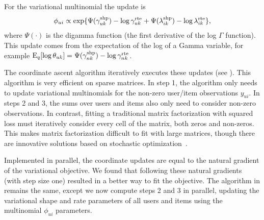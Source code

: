 \documentclass{sig-alternate}
\begin{document}
For the variational multinomial the update is
\begin{equation}
  \phi_{ui} \propto \exp\{\Psi(\gamma_{uk}^{\textrm{shp}}) - \log
  \gamma_{uk}^{\textrm{rte}} + \Psi(\lambda_{ik}^{\textrm{shp}}) - \log
  \lambda_{ik}^{\textrm{rte}}\},
\end{equation}
where $\Psi(\cdot)$ is the digamma function (the first derivative of
the log $\Gamma$ function).  This update comes from the expectation of
the log of a Gamma variable, for example $\textrm{E}_q[\log \theta_{uk}] =
\Psi(\gamma_{nk}^{\textrm{shp}}) - \log \gamma_{nk}^{\textrm{rte}}$.

The coordinate ascent algorithm iteratively executes these updates
(see ).  This algorithm is very efficient on sparse
matrices. In step 1, the algorithm only needs to update variational
multinomials for the non-zero user/item observations $y_{ui}$.  In
steps 2 and 3, the sums over users and items also only need to
consider non-zero observations.  In contrast, fitting a traditional
matrix factorization with squared loss must iteratively consider every
cell of the matrix, both zeros and non-zeros. This makes matrix
factorization difficult to fit with large matrices, though there are
innovative solutions based on stochastic
optimization~\cite{Mairal:2010}.

Implemented in parallel, the coordinate updates are equal to the
natural gradient of the variational objective. We found that following
these natural gradients~\cite{Hoffman:2013, Honkela:2008,Sato:2012}
(with step size one) resulted in a better way to fit the objective.
The algorithm in  remains the same, except we now compute
steps 2 and 3 in parallel, updating the variational shape and rate
parameters of all users and items using the multinomial $\phi_{ui}$
parameters.

\end{document}
